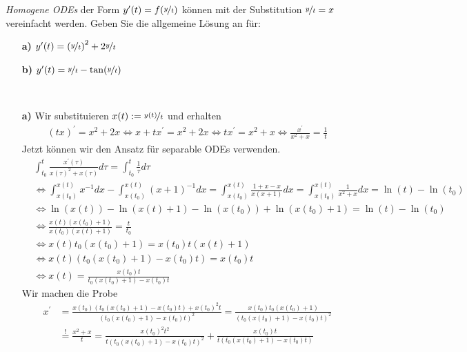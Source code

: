 \begin{exercise}
\textit{Homogene ODEs} der Form $y^{\prime}(t) = f(\nicefrac{y}{t})$
können mit der Substitution $\nicefrac{y}{t} = x$ vereinfacht werden.
Geben Sie die allgemeine Lösung an für:
\begin{itemize}
  \item [\textbf{a)}] $y^{\prime}(t) = \left(\nicefrac{y}{t}\right)^2
  + 2\nicefrac{y}{t}$
  \item [\textbf{b)}] $y^{\prime}(t) = \nicefrac{y}{t} - \tan(\nicefrac{y}{t})$
\end{itemize}
\end{exercise}
\begin{solution}
\leavevmode \\
\begin{itemize}
  \item [\textbf{a)}] Wir substituieren $x(t) := \nicefrac{y(t)}{t}$ und erhalten
  \begin{align*}
    (tx)^{\prime} = x^2 + 2x \iff x + tx^\prime = x^2 + 2x \iff t x^\prime = x^2 + x \iff \frac{x^{\prime}}{x^2 + x} = \frac{1}{t}
  \end{align*}
  Jetzt können wir den Ansatz für separable ODEs verwenden.
  \begin{align*}
    &\int_{t_0}^t \frac{x^{\prime}(\tau)}{x(\tau)^2 + x(\tau)}d\tau = \int_{t_0}^t \frac{1}{\tau}d\tau \\
    &\iff \int_{x(t_0)}^{x(t)} x^{-1} dx - \int_{x(t_0)}^{x(t)} (x + 1)^{-1} dx = \int_{x(t_0)}^{x(t)} \frac{1 + x - x}{x(x + 1)} dx =
    \int_{x(t_0)}^{x(t)} \frac{1}{x^2 + x}dx = \ln(t) - \ln(t_0)\\
    &\iff \ln(x(t)) - \ln(x(t) + 1) - \ln(x(t_0)) + \ln(x(t_0) + 1) = \ln(t) - \ln(t_0)\\
    &\iff \frac{x(t)(x(t_0) + 1)}{x(t_0)(x(t) + 1)} = \frac{t}{t_0} \\
    &\iff x(t)t_0(x(t_0) + 1) = x(t_0)t(x(t) + 1) \\
    &\iff x(t)(t_0(x(t_0) + 1) - x(t_0)t) = x(t_0)t \\
    &\iff x(t) = \frac{x(t_0)t}{t_0(x(t_0) + 1) - x(t_0)t}
  \end{align*}
  Wir machen die Probe
  \begin{align*}
    x^{\prime} &= \frac{x(t_0)(t_0(x(t_0) + 1) - x(t_0)t) + x(t_0)^2t}{(t_0(x(t_0) + 1) - x(t_0)t)^2}
    = \frac{x(t_0)t_0(x(t_0) + 1)}{(t_0(x(t_0) + 1) - x(t_0)t)^2}\\
    &\stackrel{!}{=} \frac{x^2 + x}{t}
    = \frac{x(t_0)^2t^2}{t(t_0(x(t_0) + 1) - x(t_0)t)^2} + \frac{x(t_0)t}{t(t_0(x(t_0) + 1) - x(t_0)t)} \\

\end{align*}
\end{itemize}
\end{solution}
